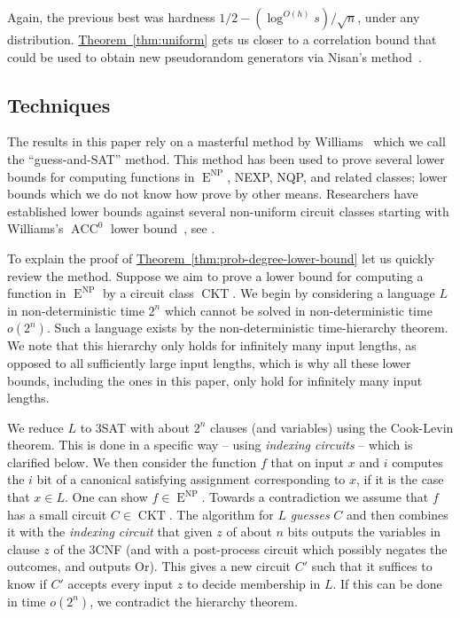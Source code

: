 \documentclass[11pt]{article}
\newcommand{\expref}[2]{\texorpdfstring{\hyperref[#2]{#1~\ref{#2}}}{#1~\ref{#2}}}
\DeclareMathOperator{\ACC}{\mathrm{ACC}}  %
\DeclareMathOperator{\NP}{\mathrm{NP}}  %
\DeclareMathOperator{\EEE}{\mathrm{E}}  %
\DeclareMathOperator{\CKT}{\mathrm{CKT}}  %
\begin{document}
%

Again, the previous best was hardness $1/2-(\log^{O(h)}s)/\sqrt{n}$,
under any distribution. \expref{Theorem}{thm:uniform} gets us closer
to a correlation bound that could be used to obtain new pseudorandom
generators via Nisan's method~\cite{Nis91}.

\subsection{Techniques \label{subsec:Techniques}}

The results in this paper rely on a masterful method by Williams~\cite{Williams13-Improving}
which we call the ``guess-and-SAT'' method. This method has been
used to prove several lower bounds for computing functions in $\EEE^{\NP}$, NEXP, NQP,
and related classes; lower bounds which we do not know how prove by
other means. Researchers have established lower bounds against several
non-uniform circuit classes starting with
%
Williams's  %
$\ACC^{0}$ lower
bound~\cite{Williams14-acc-jacm}, see \cite{Williams11,Williams13,Williams14,AlmanCW16,Tamaki16,DBLP:journals/eccc/Chen19,DBLP:conf/latin/ChenOS18,DBLP:conf/stoc/MurrayW18,DBLP:conf/mfcs/RajgopalS018,AlmanC19,VyasWilliams20,ChenRen20}.

To explain the proof of \expref{Theorem}{thm:prob-degree-lower-bound}
let us quickly review the method. Suppose we aim to prove a lower
bound for computing a function in $\EEE^{\NP}$ by a circuit class $\CKT$.
We begin by considering a language $L$ in non-deterministic time
$2^{n}$ which cannot be solved in non-deterministic time $o(2^{n})$.
Such a language exists by the non-deterministic time-hierarchy theorem.
We note that this hierarchy only holds for infinitely many input lengths,
as opposed to all sufficiently large input lengths, which is why all
these lower bounds, including the ones in this paper, only hold for
infinitely many input lengths.

We reduce $L$ to 3SAT with about $2^{n}$ clauses (and variables)
using the Cook-Levin theorem. This is done in a specific way -- using
\emph{indexing circuits} -- which is clarified below. We then consider
the function $f$ that on input $x$ and $i$ computes the $i$ bit
of a canonical satisfying assignment corresponding to $x$, if it
is the case that $x\in L$. One can show $f\in \EEE^{\NP}$. Towards a
contradiction we assume that $f$ has a small circuit $C\in \CKT$.
The algorithm for $L$ \emph{guesses }$C$ and then combines it with
the \emph{indexing circuit} that given $z$ of about $n$ bits outputs
the variables in clause $z$ of the 3CNF (and with a post-process
circuit which possibly negates the outcomes, and outputs Or). This
gives a new circuit $C'$ such that it suffices to know if $C'$ accepts
every input $z$ to decide membership in $L$. If this can be done
in time $o(2^{n})$, we contradict the hierarchy theorem.
\end{document}
